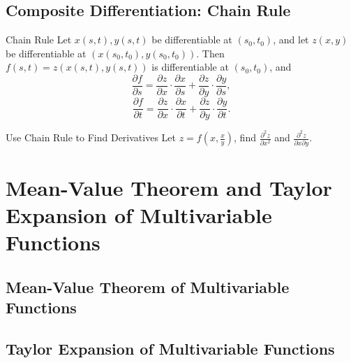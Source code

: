 \subsection{Composite Differentiation: Chain Rule}

\begin{theorem}{Chain Rule}{}
  Let $x(s,t), y(s,t)$ be differentiable at $(s_0, t_0)$,
  and let $z(x, y)$ be differentiable at $(x(s_0, t_0), y(s_0,t_0))$.
  Then $f(s,t) = z(x(s,t), y(s,t))$ is differentiable at $(s_0,t_0)$, and
  \begin{equation}
    \frac{\partial f}{\partial s} = \frac{\partial z}{\partial x} \cdot \frac{\partial x}{\partial s} + \frac{\partial z}{\partial y} \cdot \frac{\partial y}{\partial s},
  \end{equation}
  \begin{equation}
    \frac{\partial f}{\partial t} = \frac{\partial z}{\partial x} \cdot \frac{\partial x}{\partial t} + \frac{\partial z}{\partial y} \cdot \frac{\partial y}{\partial t}.
  \end{equation}
\end{theorem}

\begin{example}{Use Chain Rule to Find Derivatives}{}
  Let $z = f \left( x, \frac{x}{y} \right)$, find $\frac{\partial^2 z}{\partial
    x^2}$ and $\frac{\partial^2 z}{\partial x\partial y}$.
\end{example}



\section{Mean-Value Theorem and Taylor Expansion of Multivariable Functions}

\subsection{Mean-Value Theorem of Multivariable Functions}

\subsection{Taylor Expansion of Multivariable Functions}








